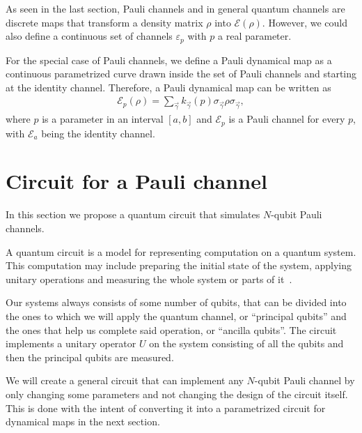 \documentclass[10pt,letterpaper]{article} %
\begin{document}
As seen in the last section, Pauli channels and in 
general quantum channels are discrete maps
that transform a density matrix $\rho$ into $\mathcal{E}(\rho)$.
However, we could also define a continuous set of 
channels $\varepsilon_p$ with $p$ a real parameter.

For the special case of Pauli channels, we define 
a Pauli dynamical map as a continuous parametrized 
curve drawn inside the set of Pauli channels and starting at the identity channel. 
Therefore, a Pauli dynamical map can be written as
\begin{eqnarray}
\label{eq: Pauli dynamical map}
\mathcal{E}_p(\rho) = \sum_{\vec{\gamma}} k_{\vec{\gamma}}(p) \sigma_{\vec{\gamma}} \rho \sigma_{\vec{\gamma}},
\end{eqnarray}
where $p$ is a parameter in an interval $[a,b]$ 
and $\mathcal{E}_p$ is a Pauli channel for every $p$, 
with $\mathcal{E}_a$ being the identity channel.

\section{Circuit for a Pauli channel} %
\label{sec: Circuit for a Pauli Channel}

In this section we propose a quantum circuit that simulates $N$-qubit Pauli
channels.  \\


{\color{green} A quantum circuit is a model for representing computation on a quantum system. 
This computation may include preparing the initial state of the system, applying unitary operations and measuring the whole system or parts of it~\cite{Rieffel}.

Our systems always consists of some number of qubits,
that can be divided into the ones to which we will apply the quantum channel,
 or ``principal qubits'' and the ones that help us complete said operation, or ``ancilla qubits''.
The circuit implements a unitary operator $U$ on the 
system consisting of all the qubits 
and then the principal qubits are measured. 

We will create a general circuit that can implement any $N$-qubit Pauli channel
by only changing some parameters and not changing the design of the circuit itself.
This is done with the intent of converting it into a parametrized circuit for dynamical maps in the next section.
} 
\end{document}
